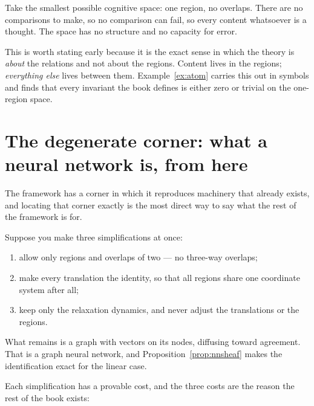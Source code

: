 Take the smallest possible cognitive space: one region, no overlaps. There are
no comparisons to make, so no comparison can fail, so every content whatsoever
is a thought. The space has no structure and no capacity for error.

This is worth stating early because it is the exact sense in which the theory
is \emph{about} the relations and not about the regions. Content lives in the
regions; \emph{everything else} lives between them. Example~\ref{ex:atom}
carries this out in symbols and finds that every invariant the book defines is
either zero or trivial on the one-region space.

\section{The degenerate corner: what a neural network is, from here}
\label{sec:degenerate}

The framework has a corner in which it reproduces machinery that already
exists, and locating that corner exactly is the most direct way to say what
the rest of the framework is for.

\begin{intu}\Intu
Suppose you make three simplifications at once:
\begin{enumerate}
  \item allow only regions and overlaps of two --- no three-way overlaps;
  \item make every translation the identity, so that all regions share one
    coordinate system after all;
  \item keep only the relaxation dynamics, and never adjust the translations
    or the regions.
\end{enumerate}
What remains is a graph with vectors on its nodes, diffusing toward agreement.
That is a graph neural network, and Proposition~\ref{prop:nnsheaf} makes the
identification exact for the linear case.
\end{intu}

Each simplification has a provable cost, and the three costs are the reason
the rest of the book exists:

